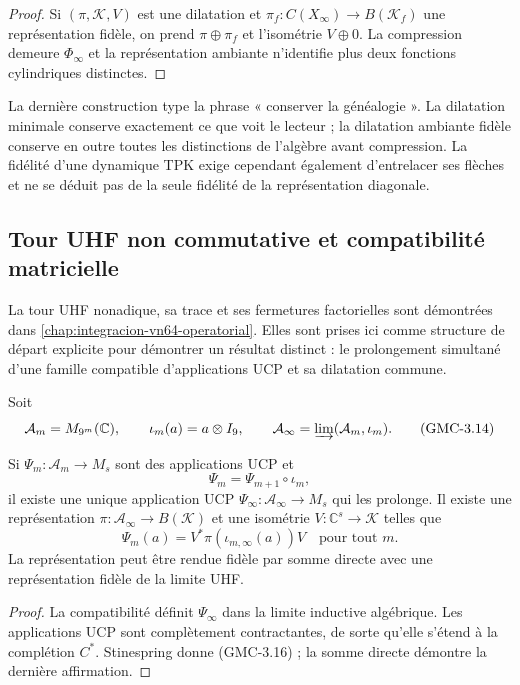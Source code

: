\begin{proof}
Si $(\pi,\mathcal K,V)$ est une dilatation et
$\pi_f:C(X_\infty)\to B(\mathcal K_f)$ une représentation fidèle, on prend
$\pi\oplus\pi_f$ et l'isométrie $V\oplus0$. La compression demeure
$\Phi_\infty$ et la représentation ambiante n'identifie plus deux fonctions
cylindriques distinctes.
\end{proof}

La dernière construction type la phrase « conserver la généalogie ». La
dilatation minimale conserve exactement ce que voit le lecteur ; la dilatation
ambiante fidèle conserve en outre toutes les distinctions de l'algèbre avant
compression. La fidélité d'une dynamique TPK exige cependant également
d'entrelacer ses flèches et ne se déduit pas de la seule fidélité de la
représentation diagonale.

\subsection{Tour UHF non commutative et compatibilité matricielle}

La tour UHF nonadique, sa trace et ses fermetures factorielles sont démontrées dans
\cref{chap:integracion-vn64-operatorial}. Elles sont prises ici comme structure de
départ explicite pour démontrer un résultat distinct : le prolongement
simultané d'une famille compatible d'applications UCP et sa dilatation
commune.

Soit
\[
 \mathcal A_m=M_{9^m}(\mathbb C),
 \qquad \iota_m(a)=a\otimes I_9,
 \qquad
 \mathcal A_\infty=\varinjlim(\mathcal A_m,\iota_m).
 \tag{GMC-3.14}
\]

\begin{theorem}
\label{p12-83-c22-s4:gmc:thm:dilatacion-uhf}
Si $\Psi_m:\mathcal A_m\to M_s$ sont des applications UCP et
\[
 \Psi_m=\Psi_{m+1}\circ\iota_m,
 \tag{GMC-3.15}
\]
il existe une unique application UCP
$\Psi_\infty:\mathcal A_\infty\to M_s$ qui les prolonge. Il existe une
représentation $\pi:\mathcal A_\infty\to B(\mathcal K)$ et une isométrie
$V:\mathbb C^s\to\mathcal K$ telles que
\[
 \Psi_m(a)=V^*\pi(\iota_{m,\infty}(a))V
 \quad\text{pour tout }m.
 \tag{GMC-3.16}
\]
La représentation peut être rendue fidèle par somme directe avec une représentation
fidèle de la limite UHF.
\end{theorem}

\begin{proof}
La compatibilité définit $\Psi_\infty$ dans la limite inductive algébrique. Les
applications UCP sont complètement contractantes, de sorte qu'elle s'étend à la
complétion $C^*$. Stinespring donne \textup{(GMC-3.16)} ; la somme directe démontre la
dernière affirmation.
\end{proof}

